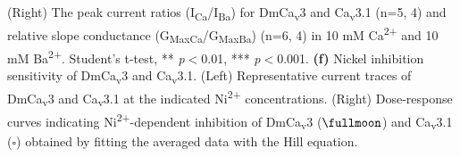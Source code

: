 (Right) The peak current ratios (I\textsubscript{Ca}/I\textsubscript{Ba}) for DmCa\textsubscript{v}3 and Ca\textsubscript{v}3.1 (n=5, 4) and relative slope conductance (G\textsubscript{MaxCa}/G\textsubscript{MaxBa}) (n=6, 4) in 10 mM Ca\textsuperscript{2+} and 10 mM Ba\textsuperscript{2+}.
Student's t-test, ** \emph{p}$<$0.01, *** \emph{p}$<$0.001.
\textbf{(f)} Nickel inhibition sensitivity of DmCa\textsubscript{v}3 and Ca\textsubscript{v}3.1. 
(Left) Representative current traces of DmCa\textsubscript{v}3 and Ca\textsubscript{v}3.1 at the indicated Ni\textsuperscript{2+} concentrations. 
(Right) Dose-response curves indicating Ni\textsuperscript{2+}-dependent inhibition of DmCa\textsubscript{v}3 ($\fullmoon$) and Ca\textsubscript{v}3.1 ($\square$) obtained by fitting the averaged data with the Hill equation.
